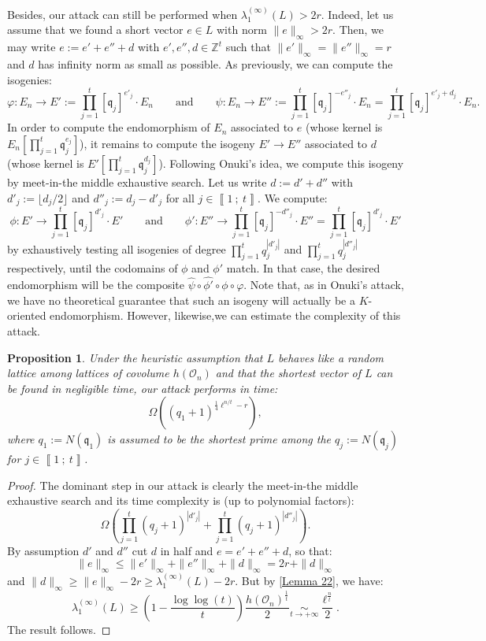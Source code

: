 \documentclass[a4paper,10pt,notitlepage]{report}
\theoremstyle{definition}
\theoremstyle{plain}
\newtheorem{Proposition}[Definition]{Proposition}
\theoremstyle{definition}
\newcommand{\Z}{\mathbb{Z}}
\newcommand{\mO}{\mathcal{O}}
\renewcommand{\i}[2]{\left\llbracket #1~;~#2\right\rrbracket}
\renewcommand{\(}{\left(}
\renewcommand{\)}{\right)}
\newcommand{\mf}[1]{\mathfrak{#1}}
\begin{document}
Besides, our attack can still be performed when $\lambda_1^{(\infty)}(L)>2r$. Indeed, let us assume that we found a short vector $e\in L$ with norm $\|e\|_\infty>2r$. Then, we may write $e:=e'+e''+d$ with $e', e'', d\in\Z^t$ such that $\|e'\|_\infty=\|e''\|_\infty=r$ and $d$ has infinity norm as small as possible. As previously, we can compute the isogenies:
\[\varphi : E_n \longrightarrow E':=\prod_{j=1}^t[\mf{q}_j]^{e'_j}\cdot E_n \qquad \mbox{and} \qquad \psi : E_n  \longrightarrow  E'':=\prod_{j=1}^t[\mf{q}_j]^{-e''_j}\cdot E_n=\prod_{j=1}^t[\mf{q}_j]^{e'_j+d_j}\cdot E_n.\]
In order to compute the endomorphism of $E_n$ associated to $e$ (whose kernel is $E_n[\prod_{j=1}^t \mf{q}_j^{e_j}]$), it remains to compute the isogeny $E'\longrightarrow E''$ associated to $d$ (whose kernel is $E'[\prod_{j=1}^t\mf{q}_j^{d_j}]$). Following Onuki's idea, we compute this isogeny by meet-in-the middle exhaustive search. Let us write $d:=d'+d''$ with $d'_j:=\lfloor d_j/2\rfloor$ and $d''_j:=d_j-d'_j$ for all $j\in\i{1}{t}$. We compute:
\[\phi: E'\longrightarrow \prod_{j=1}^t [\mf{q}_j]^{d'_j}\cdot E' \qquad \mbox{and} \qquad \phi': E''\longrightarrow \prod_{j=1}^t [\mf{q}_j]^{-d''_j}\cdot E''=\prod_{j=1}^t [\mf{q}_j]^{d'_j}\cdot E'\]
by exhaustively testing all isogenies of degree $\prod_{j=1}^t q_j^{|d'_j|}$ and $\prod_{j=1}^t q_j^{|d''_j|}$ respectively, until the codomains of $\phi$ and $\phi'$ match. In that case, the desired endomorphism will be the composite $\widehat{\psi}\circ\widehat{\phi'}\circ\phi\circ\varphi$. Note that, as in Onuki's attack, we have no theoretical guarantee that such an isogeny will actually be a $K$-oriented endomorphism. However, likewise,we can estimate the complexity of this attack.

\begin{Proposition}
Under the heuristic assumption that $L$ behaves like a random lattice among lattices of covolume $h(\mO_n)$ and that the shortest vector of $L$ can be found in negligible time, our attack performs in time:
\[\Omega\((q_1+1)^{\frac{1}{4}\ell^{n/t}-r}\),\]
where $q_1:=N(\mf{q}_1)$ is assumed to be the shortest prime among the $q_j:=N(\mf{q}_j)$ for $j\in\i{1}{t}$.
\end{Proposition} 

\begin{proof}
The dominant step in our attack is clearly the meet-in-the middle exhaustive search and its time complexity is (up to polynomial factors):
\[\Omega\(\prod_{j=1}^t (q_j+1)^{|d'_j|}+\prod_{j=1}^t (q_j+1)^{|d''_j|}\).\]
By assumption $d'$ and $d''$ cut $d$ in half and $e=e'+e''+d$, so that:
\[\|e\|_\infty\leq \|e'\|_\infty+\|e''\|_\infty+\|d\|_\infty=2r+\|d\|_\infty\]
and $\|d\|_\infty\geq \|e\|_\infty-2r\geq \lambda_1^{(\infty)}(L)-2r$.  But by \ref{Lemma 22}, we have:
\[\lambda_1^{(\infty)}(L)\geq \(1-\frac{\log\log(t)}{t}\)\frac{h(\mO_n)^{\frac{1}{t}}}{2}\underset{t\rightarrow +\infty}{\sim}\frac{\ell^{\frac{n}{t}}}{2}.\]
The result follows.
\end{proof}
\end{document}
